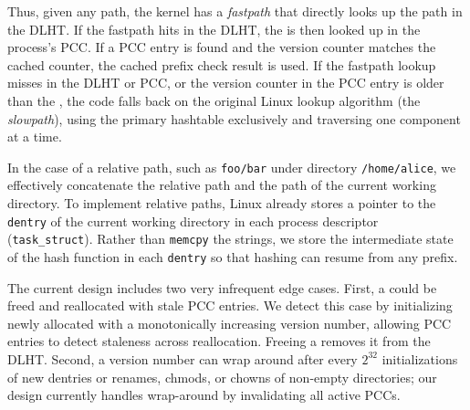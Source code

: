 Thus, given any path, the kernel
has a {\em fastpath} that directly looks up the path
in the DLHT.
If the fastpath hits in the DLHT,
the \dentry{} is then looked up in the process's PCC.
If a PCC entry is found and the version counter matches 
the cached counter, the cached prefix check result is used.
If the fastpath lookup misses in the DLHT or PCC, 
or the version counter in the PCC entry is older than the \dentry{}, 
the code falls back on the original 
Linux lookup algorithm (the {\em slowpath}),
using the primary hashtable exclusively and traversing one component at a time.

In the case of a relative path, such as {\tt foo/bar} under directory {\tt /home/alice},
we effectively concatenate the relative path and the path of the current working directory.
To implement relative paths, Linux already stores 
a pointer to the {\tt dentry} of the current working directory
in each process descriptor ({\tt task\_struct}).
Rather than {\tt memcpy} the strings, we store the intermediate state of the hash function 
in each {\tt dentry} so that hashing can resume from any prefix.

The current design includes two very infrequent edge cases.
First, a \dentry{} could be freed and reallocated with stale PCC entries.
We detect this case by initializing newly allocated \dentries{} with
a monotonically increasing version number,
allowing PCC entries to detect staleness across reallocation.
Freeing a \dentry{} removes it from the DLHT.
Second, a version number can wrap around after every $2^{32}$ initializations of new dentries or
renames, chmods, or chowns
of non-empty directories; 
our design currently handles wrap-around by invalidating all active PCCs.

